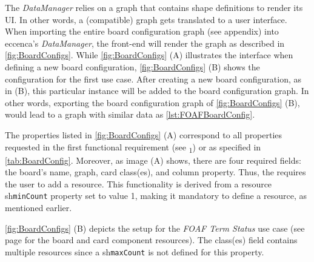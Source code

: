 \noindent The \textit{DataManager} relies on a graph that contains shape definitions to render its \acrshort*{UI}. In other words, a (compatible) graph gets translated to a user interface. When importing the entire board configuration graph (see appendix) into eccenca’s \textit{DataManager}, the front-end will render the graph as described in \autoref{fig:BoardConfigs}. While \autoref{fig:BoardConfigs} (A) illustrates the interface when defining a new board configuration, \autoref{fig:BoardConfigs} (B) shows the configuration for the first use case. After creating a new board configuration, as in (B), this particular instance will be added to the board configuration graph. In other words, exporting the board configuration graph of \autoref{fig:BoardConfigs} (B), would lead to a graph with similar data as \autoref{lst:FOAFBoardConfig}.

The properties listed in \autoref{fig:BoardConfigs} (A) correspond to all properties requested in the first functional requirement (see \textsubscript{1}) or as specified in \autoref{tab:BoardConfig}. Moreover, as image (A) shows, there are four required fields: the board’s name, graph, card class(es), and column property. Thus, the  requires the user to add a resource. This  functionality is derived from a resource \acrshort{sh}\texttt{minCount} property set to value 1, making it mandatory to define a resource, as mentioned earlier.


\autoref{fig:BoardConfigs} (B) depicts the setup for the \textit{\acrshort*{FOAF} Term Status} use case (see page \pageref{par:FOAF-BCR} for the board and card component resources). The class(es) field contains multiple resources since a \acrshort{sh}\texttt{maxCount} is not defined for this property.


